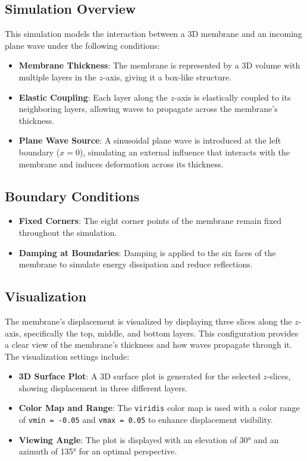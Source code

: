 \documentclass{article}
\begin{document}
\subsection{Simulation Overview}

This simulation models the interaction between a 3D membrane and an incoming plane wave under the following conditions:
\begin{itemize}
    \item \textbf{Membrane Thickness}: The membrane is represented by a 3D volume with multiple layers in the $z$-axis, giving it a box-like structure.
    \item \textbf{Elastic Coupling}: Each layer along the $z$-axis is elastically coupled to its neighboring layers, allowing waves to propagate across the membrane's thickness.
    \item \textbf{Plane Wave Source}: A sinusoidal plane wave is introduced at the left boundary ($x = 0$), simulating an external influence that interacts with the membrane and induces deformation across its thickness.
\end{itemize}

\subsection{Boundary Conditions}

\begin{itemize}
    \item \textbf{Fixed Corners}: The eight corner points of the membrane remain fixed throughout the simulation.
    \item \textbf{Damping at Boundaries}: Damping is applied to the six faces of the membrane to simulate energy dissipation and reduce reflections.
\end{itemize}

\subsection{Visualization}

The membrane's displacement is visualized by displaying three slices along the $z$-axis, specifically the top, middle, and bottom layers. This configuration provides a clear view of the membrane's thickness and how waves propagate through it. The visualization settings include:
\begin{itemize}
    \item \textbf{3D Surface Plot}: A 3D surface plot is generated for the selected $z$-slices, showing displacement in three different layers.
    \item \textbf{Color Map and Range}: The \texttt{viridis} color map is used with a color range of \texttt{vmin = -0.05} and \texttt{vmax = 0.05} to enhance displacement visibility.
    \item \textbf{Viewing Angle}: The plot is displayed with an elevation of 30° and an azimuth of 135° for an optimal perspective.
\end{itemize}
\end{document}
